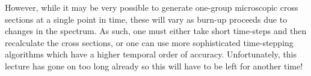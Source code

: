 \documentclass{article}
\begin{document}
However, while it may be very possible to generate one-group microscopic cross sections at a single point in time, these will vary as burn-up proceeds due to changes in the spectrum. As such, one must either take short time-steps and then recalculate the cross sections, or one can use more sophisticated time-stepping algorithms which have a higher temporal order of accuracy. Unfortunately, this lecture has gone on too long already so this will have to be left for another time!

\printbibliography
\end{document}
